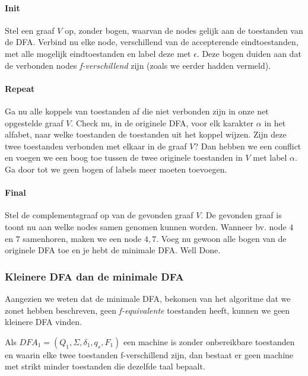 \paragraph{Init} Stel een graaf $V$ op, zonder bogen, waarvan de nodes gelijk aan de toestanden van de DFA. Verbind nu elke node, verschillend van de accepterende eindtoestanden, met alle mogelijk eindtoestanden en label deze met $\epsilon$. Deze bogen duiden aan dat de verbonden nodes \textit{f-verschillend} zijn (zoals we eerder hadden vermeld).

\paragraph{Repeat} Ga nu alle koppels van toestanden af die niet verbonden zijn in onze net opgestelde graaf $V$. Check nu, in de originele DFA, voor elk karakter $\alpha$ in het alfabet, naar welke toestanden de toestanden uit het koppel wijzen. Zijn deze twee toestanden verbonden met elkaar in de graaf $V$? Dan hebben we een conflict en voegen we een boog toe tussen de twee originele toestanden in $V$ met label $\alpha$. Ga door tot we geen bogen of labels meer moeten toevoegen.

\paragraph{Final} Stel de complementsgraaf op van de gevonden graaf $V$. De gevonden graaf is toont nu aan welke nodes samen genomen kunnen worden. Wanneer bv. node $4$ en $7$ samenhoren, maken we een node $4,7$. Voeg nu gewoon alle bogen van de originele DFA toe en je hebt de minimale DFA. Well Done.

\subsubsection*{Kleinere DFA dan de minimale DFA}

Aangezien we weten dat de minimale DFA, bekomen van het algoritme dat we zonet hebben beschreven, geen \textit{f-equivalente} toestanden heeft, kunnen we geen kleinere DFA vinden.

\begin{theorem}
	Als $DFA_1 = (Q_1,\Sigma,\delta_1,q_s,F_1)$ een machine is zonder onbereikbare toestanden en waarin elke twee toestanden f-verschillend zijn, dan bestaat er geen machine met strikt minder toestanden die dezelfde taal bepaalt.
\end{theorem}


